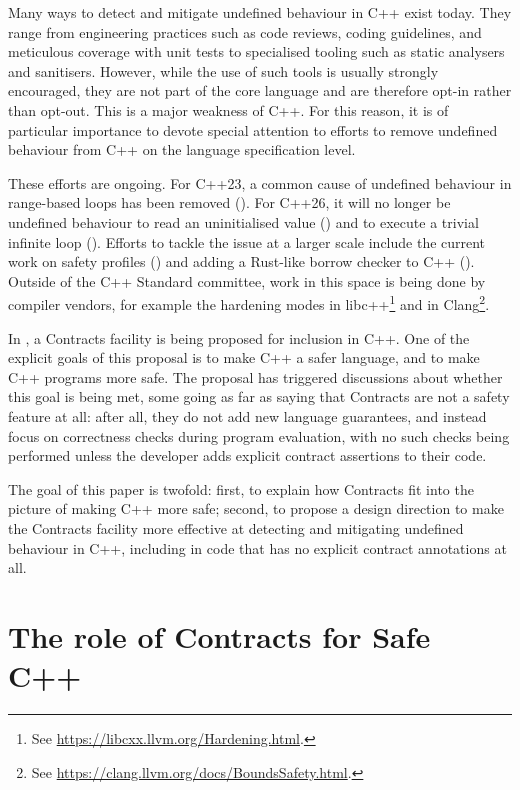 Many ways to detect and mitigate undefined behaviour in C++ exist today. They range from engineering practices such as code reviews, coding guidelines, and meticulous coverage with unit tests to specialised tooling such as static analysers and sanitisers. However, while the use of such tools is usually strongly encouraged, they are not part of the core language and are therefore opt-in rather than opt-out. This is a major weakness of C++. For this reason, it is of particular importance to devote special attention to efforts to remove undefined behaviour from C++ on the language specification level.

These efforts are ongoing. For C++23, a common cause of undefined behaviour in range-based  loops has been removed (\cite{P2012R2}). For C++26, it will no longer be undefined behaviour to read an uninitialised value (\cite{P2795R5}) and to execute a trivial infinite loop (\cite{P2809R3}). Efforts to tackle the issue at a larger scale include the current work on safety profiles (\cite{P3274R0}) and adding a Rust-like borrow checker to C++ (\cite{P3390R0}). Outside of the C++ Standard committee, work in this space is being done by compiler vendors, for example the hardening modes in libc++\footnote{See \href{https://libcxx.llvm.org/Hardening.html}{https://libcxx.llvm.org/Hardening.html}.} and  in Clang\footnote{See \href{https://clang.llvm.org/docs/BoundsSafety.html}{https://clang.llvm.org/docs/BoundsSafety.html}.}.

In \cite{P2900R8}, a Contracts facility is being proposed for inclusion in C++. One of the explicit goals of this proposal is to make C++ a safer language, and to make C++ programs more safe. The proposal has triggered discussions about whether this goal is being met, some going as far as saying that Contracts are not a safety feature at all: after all, they do not add new language guarantees, and instead focus on correctness checks during program evaluation, with no such checks being performed unless the developer adds explicit contract assertions to their code.

The goal of this paper is twofold: first, to explain how Contracts fit into the picture of making C++ more safe; second, to propose a design direction to make the Contracts facility more effective at detecting and mitigating undefined behaviour in C++, including in code that has no explicit contract annotations at all.

\section{The role of Contracts for Safe C++}
\label{role}

